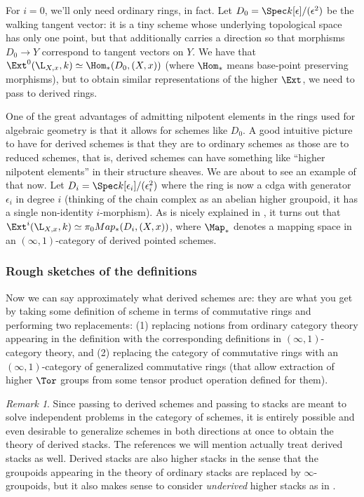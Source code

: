 \documentclass{conm-p-l}
\theoremstyle{definition} \newtheorem{definition}[theorem]{Definition}
\theoremstyle{remark} \newtheorem{remark}[theorem]{Remark}
\numberwithin{equation}{section}
\newcommand{\oo}{\infty}
\newcommand{\io}{$(\oo,1)$}
\begin{document}
For $i=0$, we'll only need ordinary rings, in fact. Let $D_0 = \Spec
k[\epsilon]/(\epsilon^2)$ be the walking tangent vector: it is a tiny
scheme whose underlying topological space has only one point, but that
additionally carries a direction so that morphisms $D_0 \to Y$
correspond to tangent vectors on $Y$.  We have that $\Ext^0(\L_{X,x},
k) \simeq \Hom_\ast(D_0, (X,x))$ (where $\Hom_\ast$ means base-point
preserving morphisms), but to obtain similar representations of the
higher $\Ext$, we need to pass to derived rings.

One of the great advantages of admitting nilpotent elements in the
rings used for algebraic geometry is that it allows for schemes like
$D_0$. A good intuitive picture to have for derived schemes is that
they are to ordinary schemes as those are to reduced schemes, that is,
derived schemes can have something like ``higher nilpotent elements''
in their structure sheaves. We are about to see an example of that
now. Let $D_i = \Spec k[\epsilon_i]/(\epsilon_i^2)$ where the ring is
now a cdga with generator $\epsilon_i$ in degree $i$ (thinking of the
chain complex as an abelian higher groupoid, it has a single
non-identity $i$-morphism). As is nicely explained in \cite{VezzosiL},
it turns out that $\Ext^i(\L_{X,x}, k) \simeq \pi_0 Map_\ast(D_i,
(X,x))$, where $\Map_\ast$ denotes a mapping space in an \io-category
of derived pointed schemes.

\subsubsection{Rough sketches of the definitions}

Now we can say approximately what derived schemes are: they are what
you get by taking some definition of scheme in terms of commutative
rings and performing two replacements: (1) replacing notions from
ordinary category theory appearing in the definition with the
corresponding definitions in \io-category theory, and (2) replacing
the category of commutative rings with an \io-category of generalized
commutative rings (that allow extraction of higher $\Tor$ groups from
some tensor product operation defined for them).

\begin{remark}
  Since passing to derived schemes and passing to stacks are meant
  to solve independent problems in the category of schemes, it is
  entirely possible and even desirable to generalize schemes in both
  directions at once to obtain the theory of derived stacks.
  The references we will mention actually treat derived stacks as well.
  Derived stacks are also higher stacks in the sense that
  the groupoids appearing in the theory of ordinary stacks are
  replaced by $\oo$-groupoids, but it also makes sense to consider
  \emph{underived} higher stacks as in \cite{SimpsonStacks}.
\end{remark}
\end{document}
